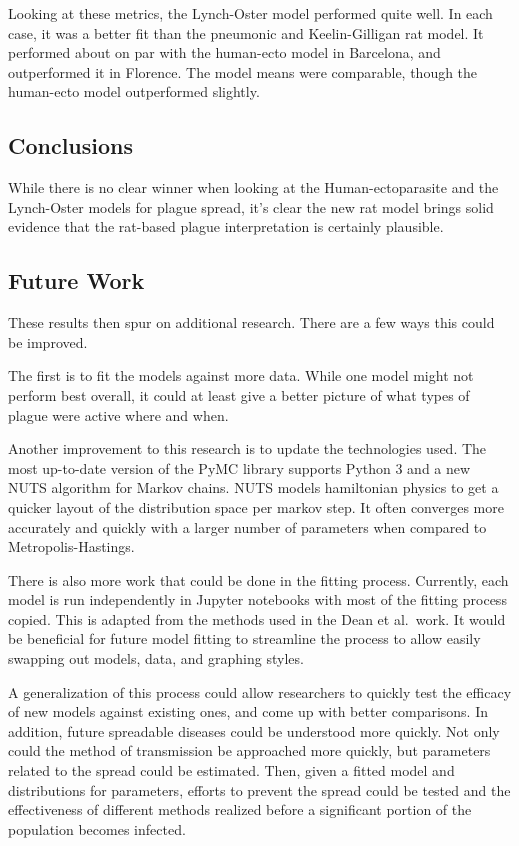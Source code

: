 \documentclass [letterpaper, 12pt] {article}
\begin{document}
Looking at these metrics, the Lynch-Oster model performed quite well. In each case, it was a better fit than the pneumonic and Keelin-Gilligan rat model. It performed about on par with the human-ecto model in Barcelona, and outperformed it in Florence. The model means were comparable, though the human-ecto model outperformed slightly.

\vspace{-0.3cm}

\subsection{Conclusions}
\vspace{-0.3cm}
While there is no clear winner when looking at the Human-ectoparasite and the Lynch-Oster models for plague spread, it's clear the new rat model brings solid evidence that the rat-based plague interpretation is certainly plausible.

\vspace{-0.3cm}
\subsection{Future Work}
\vspace{-0.3cm}
These results then spur on additional research. There are a few ways this could be improved.

The first is to fit the models against more data. While one model might not perform best overall, it could at least give a better picture of what types of plague were active where and when.

Another improvement to this research is to update the technologies used. The most up-to-date version of the PyMC library supports Python 3 and a new NUTS algorithm for Markov chains. NUTS models hamiltonian physics to get a quicker layout of the distribution space per markov step. It often converges more accurately and quickly with a larger number of parameters when compared to Metropolis-Hastings.

There is also more work that could be done in the fitting process. Currently, each model is run independently in Jupyter notebooks with most of the fitting process copied. This is adapted from the methods used in the Dean et al.\ work. It would be beneficial for future model fitting to streamline the process to allow easily swapping out models, data, and graphing styles.

A generalization of this process could allow researchers to quickly test the efficacy of new models against existing ones, and come up with better comparisons. In addition, future spreadable diseases could be understood more quickly. Not only could the method of transmission be approached more quickly, but parameters related to the spread could be estimated. Then, given a fitted model and distributions for parameters, efforts to prevent the spread could be tested and the effectiveness of different methods realized before a significant portion of the population becomes infected.

\pagebreak



\end{document}
